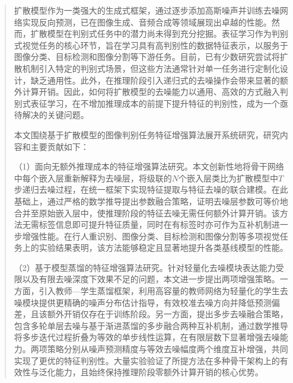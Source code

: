 ﻿\setlength{\baselineskip}{20pt}
\begin{abstract}

扩散模型作为一类强大的生成式框架，通过逐步添加高斯噪声并训练去噪网络实现反向预测，已在图像生成、音频合成等领域展现出卓越的性能。然而，扩散模型在判别式任务中的潜力尚未得到充分挖掘。表征学习作为判别式视觉任务的核心环节，旨在学习具有高判别性的数据特征表示，以服务于图像分类、目标检测和图像分割等下游任务。目前，已有少数研究尝试将扩散机制引入特定的判别式场景，但这些方法通常针对单一任务进行定制化设计，缺乏通用性。此外，在推理阶段引入递归式的去噪操作会带来显著的额外计算开销。因此，如何将扩散模型的去噪能力以通用、高效的方式融入判别式表征学习，在不增加推理成本的前提下提升特征的判别性，成为一个亟待解决的关键问题。

本文围绕基于扩散模型的图像判别任务特征增强算法展开系统研究，研究内容和主要贡献如下：

（1）面向无额外推理成本的特征增强算法研究。本文创新性地将骨干网络中每个嵌入层重新解释为去噪层，将级联的$N$个嵌入层类比为扩散模型中$T$步递归去噪过程，在统一框架下实现特征提取与特征去噪的联合建模。在此基础上，通过严格的数学推导提出参数融合策略，证明去噪层参数可等价地合并至原始嵌入层中，使推理阶段的特征去噪无需任何额外计算开销。该方法无需标签信息即可提升特征质量，同时在有标签时亦可作为互补机制进一步增强性能。在行人重识别、图像分类、目标检测和图像分割等多项视觉任务上的实验结果表明，该方法能够稳定且显著地提升各类基线模型的性能。

（2）基于模型蒸馏的特征增强算法研究。针对轻量化去噪模块表达能力受限以及有限去噪深度下效果不足的问题，本文进一步提出两项增强策略。一方面，引入教师—学生蒸馏框架，利用高容量的教师网络为轻量化的学生去噪模块提供更精确的噪声分布估计指导，有效校准去噪方向并降低预测偏差，且该额外开销仅存在于训练阶段。另一方面，提出多步去噪融合策略，包含多轮单层去噪与基于渐进蒸馏的多步融合两种互补机制，通过数学推导将多步迭代过程折叠为等效的单步线性运算，在有限层数下显著增强去噪能力。两项策略分别从噪声预测精度与等效去噪幅度两个维度互补增强，共同实现了更优的特征判别性。大量实验验证了所提方法在多种骨干架构上的有效性与泛化能力，且始终保持推理阶段零额外计算开销的核心优势。

\par\noindent{}
\end{abstract}